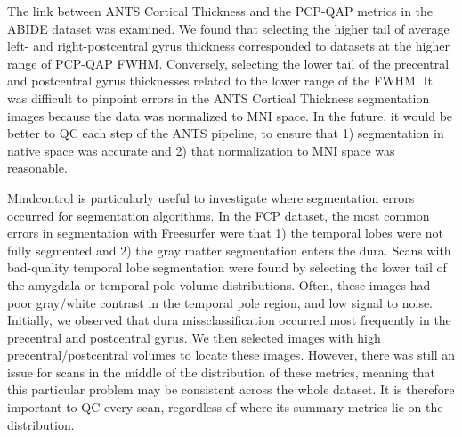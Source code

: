 The link between ANTS Cortical Thickness and the PCP-QAP metrics in the ABIDE dataset was examined. We found that selecting the higher tail of average left- and right-postcentral gyrus thickness corresponded to datasets at the higher range of PCP-QAP FWHM. Conversely, selecting the lower tail of the precentral and postcentral gyrus thicknesses related to the lower range of the FWHM. It was difficult to pinpoint errors in the ANTS Cortical Thickness segmentation images because the data was normalized to MNI space. In the future, it would be better to QC each step of the ANTS pipeline, to ensure that 1) segmentation in native space was accurate and 2) that normalization to MNI space was reasonable. 

Mindcontrol is particularly useful to investigate where segmentation errors occurred for segmentation algorithms. In the FCP dataset, the most common errors in segmentation with Freesurfer were that 1) the temporal lobes were not fully segmented and 2) the gray matter segmentation enters the dura. Scans with bad-quality temporal lobe segmentation were found by selecting the lower tail of the amygdala or temporal pole volume distributions. Often, these images had poor gray/white contrast in the temporal pole region, and low signal to noise. Initially, we observed that dura missclassification occurred most frequently in the precentral and postcentral gyrus. We then selected images with high precentral/postcentral volumes to locate these images. However, there was still an issue for scans in the middle of the distribution of these metrics, meaning that this particular problem may be consistent across the whole dataset. It is therefore important to QC every scan, regardless of where its summary metrics lie on the distribution.  

